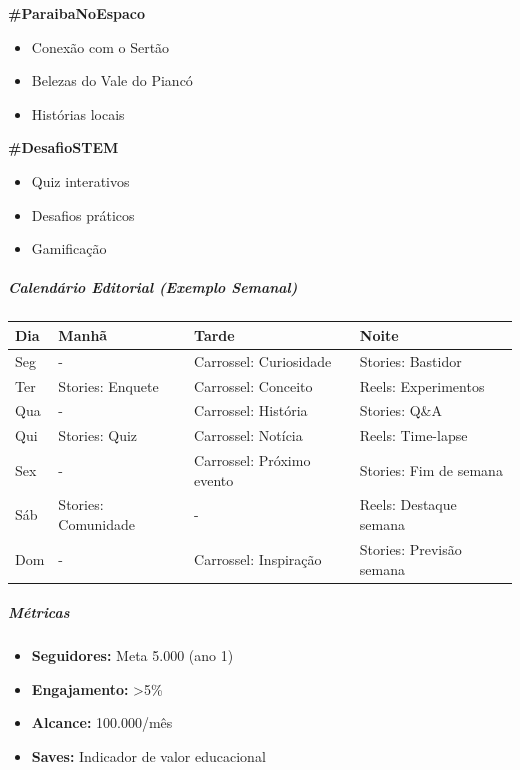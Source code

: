 \textbf{\#ParaibaNoEspaco}

\begin{itemize}
\item Conexão com o Sertão
\item Belezas do Vale do Piancó
\item Histórias locais
\end{itemize}

\textbf{\#DesafioSTEM}

\begin{itemize}
\item Quiz interativos
\item Desafios práticos
\item Gamificação
\end{itemize}

\subparagraph{Calendário Editorial (Exemplo Semanal)}

\bigskip\noindent
\begin{tabular}{p{}p{}p{}p{}}
\toprule
Dia & Manhã & Tarde & Noite \\
\hline
Seg & - & Carrossel: Curiosidade & Stories: Bastidor \\
Ter & Stories: Enquete & Carrossel: Conceito & Reels: Experimentos \\
Qua & - & Carrossel: História & Stories: Q\&A \\
Qui & Stories: Quiz & Carrossel: Notícia & Reels: Time-lapse \\
Sex & - & Carrossel: Próximo evento & Stories: Fim de semana \\
Sáb & Stories: Comunidade & - & Reels: Destaque semana \\
Dom & - & Carrossel: Inspiração & Stories: Previsão semana \\
\bottomrule
\end{tabular}

\bigskip

\subparagraph{Métricas}

\begin{itemize}
\item \textbf{Seguidores:} Meta 5.000 (ano 1)
\item \textbf{Engajamento:} \textgreater 5\%
\item \textbf{Alcance:} 100.000/mês
\item \textbf{Saves:} Indicador de valor educacional
\end{itemize}


